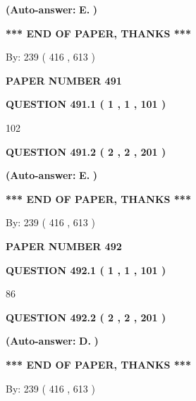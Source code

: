 \documentclass[12pt]{article}
\begin{document}
 
{\textbf{(Auto-answer:}}
{\textbf{\large{
E.}}}
{\textbf{)}}
 
 
   
   
   
   
\vspace{1.0in} 
{\textbf{\large{ *** END OF PAPER, THANKS *** }}} 
   
   
\hspace{1.0in} By: 
 239 ( 416 ,  613 )
   
   
   
   
\newpage 
\setcounter{page}{ 
   491001 } 
   
   
 {\textbf{ \Large{ PAPER NUMBER  491  }}}
   
   
   
   
  
  
{\textbf{\large{QUESTION
491.1 
 ( 1 , 1 , 101 )
}}}

102
  
  
{\textbf{\large{QUESTION
491.2 
 ( 2 , 2 , 201 )
}}}
 
 
{\textbf{(Auto-answer:}}
{\textbf{\large{
E.}}}
{\textbf{)}}
 
 
   
   
   
   
\vspace{1.0in} 
{\textbf{\large{ *** END OF PAPER, THANKS *** }}} 
   
   
\hspace{1.0in} By: 
 239 ( 416 ,  613 )
   
   
   
   
\newpage 
\setcounter{page}{ 
   492001 } 
   
   
 {\textbf{ \Large{ PAPER NUMBER  492  }}}
   
   
   
   
  
  
{\textbf{\large{QUESTION
492.1 
 ( 1 , 1 , 101 )
}}}

86
  
  
{\textbf{\large{QUESTION
492.2 
 ( 2 , 2 , 201 )
}}}
 
 
{\textbf{(Auto-answer:}}
{\textbf{\large{
D.}}}
{\textbf{)}}
 
 
   
   
   
   
\vspace{1.0in} 
{\textbf{\large{ *** END OF PAPER, THANKS *** }}} 
   
   
\hspace{1.0in} By: 
 239 ( 416 ,  613 )
   
   
   
\end{document}
